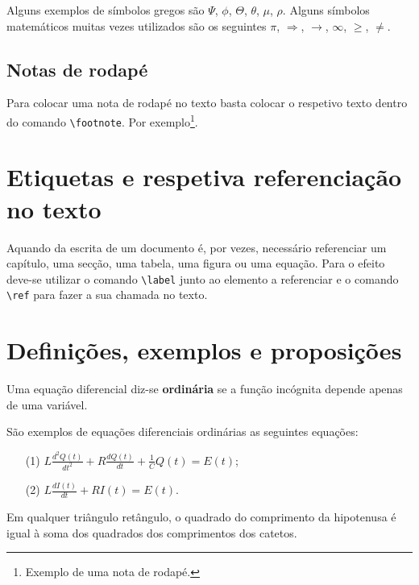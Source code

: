     Alguns exemplos de símbolos gregos são $\Psi$, $\phi$, $\Theta$, $\theta$, $\mu$, $\rho$. Alguns símbolos matemáticos muitas vezes utilizados são os seguintes $\pi$, $\Rightarrow$, $\rightarrow$, $\infty$, $\geq$, $\neq$.

\subsection{Notas de rodapé}

    Para colocar uma nota de rodapé no texto basta colocar o respetivo texto dentro do comando \verb|\footnote|. Por exemplo\footnote{Exemplo de uma nota de rodapé.}.

\section{Etiquetas e respetiva referenciação no texto}

    Aquando da escrita de um documento é, por vezes, necessário referenciar um capítulo, uma secção, uma tabela, uma figura ou uma equação. Para o efeito deve-se utilizar o comando \verb|\label| junto ao elemento a referenciar e o comando \verb|\ref| para fazer a sua chamada no texto.

\section{Definições, exemplos e proposições}
    \label{cap2:sec_def}
    
    \begin{definition}
    Uma equação diferencial diz-se {\bf ordinária} se a
    função incógnita depende apenas de uma variável.
    \end{definition}
    
    \bigskip %
    
    \begin{example}
    São exemplos de equações diferenciais ordinárias as seguintes equações:
    \begin{enumerate}
    \item[(1)]
    $L\frac{d^2Q(t)}{dt^2}+R\frac{dQ(t)}{dt}+\frac{1}{C}Q(t)=E(t)$;
    \item[(2)] $L\frac{dI(t)}{dt}+RI(t)=E(t)$.
    \end{enumerate}
    \end{example}
    
   \bigskip
    
    \begin{proposition}
    Em qualquer triângulo retângulo, o quadrado do comprimento da hipotenusa é igual à soma dos quadrados dos comprimentos dos catetos.  
    \end{proposition}
    
